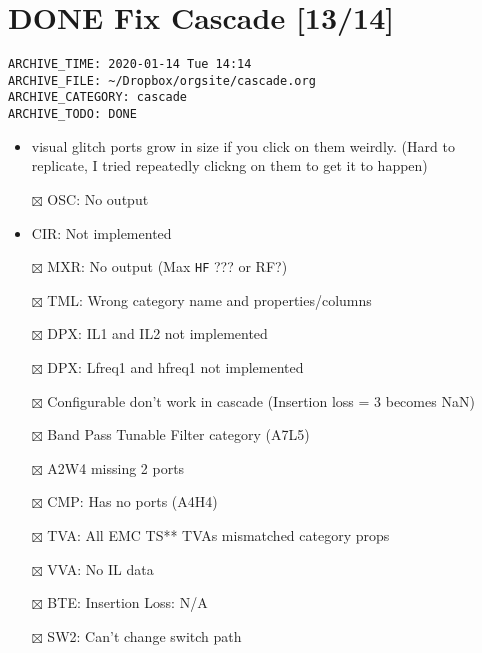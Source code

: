 \documentclass[11pt]{article}
\begin{document}
\section*{{\bfseries\sffamily DONE}  Fix Cascade [13/14]}
\label{sec:orgc9f9b0e}
\begin{verbatim}
ARCHIVE_TIME: 2020-01-14 Tue 14:14
ARCHIVE_FILE: ~/Dropbox/orgsite/cascade.org
ARCHIVE_CATEGORY: cascade
ARCHIVE_TODO: DONE
\end{verbatim}
\begin{itemize}
\item visual glitch ports grow in size if you click on them weirdly. (Hard to replicate, I tried repeatedly clickng on them to get it to happen)\\
\item[{$\boxtimes$}] OSC: No output\\
\item CIR: Not implemented\\
\item[{$\boxtimes$}] MXR: No output (Max \texttt{HF} ??? or RF?)\\
\item[{$\boxtimes$}] TML: Wrong category name and properties/columns\\
\item[{$\boxtimes$}] DPX: IL1 and IL2 not implemented\\
\item[{$\boxtimes$}] DPX: Lfreq1 and hfreq1 not implemented\\
\item[{$\boxtimes$}] Configurable don't work in cascade (Insertion loss = 3 becomes NaN)\\
\item[{$\boxtimes$}] Band Pass Tunable Filter category (A7L5)\\
\item[{$\boxtimes$}] A2W4 missing 2 ports\\
\item[{$\boxtimes$}] CMP: Has no ports (A4H4)\\
\item[{$\boxtimes$}] TVA: All EMC TS** TVAs mismatched category props\\
\item[{$\boxtimes$}] VVA: No IL data\\
\item[{$\boxtimes$}] BTE: Insertion Loss: N/A\\
\item[{$\boxtimes$}] SW2: Can't change switch path\\
\end{itemize}
\end{document}
